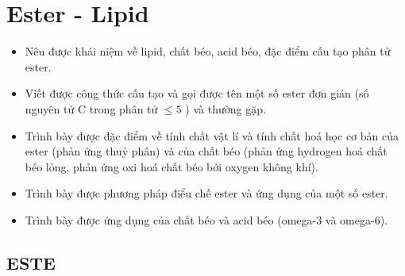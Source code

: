 \section{Ester - Lipid}
\begin{Muctieu}
	\begin{itemize}
		\item  Nêu được khái niệm về lipid, chất béo, acid béo, đặc điểm cấu tạo phân tử ester.
		\item  Viết được công thức cấu tạo và gọi được tên một số ester đơn giản (số nguyên tử C trong phân tử $\leq 5$ ) và thường gặp.
		\item  Trình bày được đặc điểm về tính chất vật lí và tính chất hoá học cơ bản của ester (phản ứng thuỷ phân) và của chất béo (phản ứng hydrogen hoá chất béo lỏng, phản ứng oxi hoá chất béo bởi oxygen không khí).
		\item  Trình bày được phương pháp điểu chế ester và ứng dụng của một số ester.
		\item  Trình bày được ứng dụng của chất béo và acid béo (omega-3 và omega-6).
	\end{itemize}
\end{Muctieu}
\subsection{ESTE}
